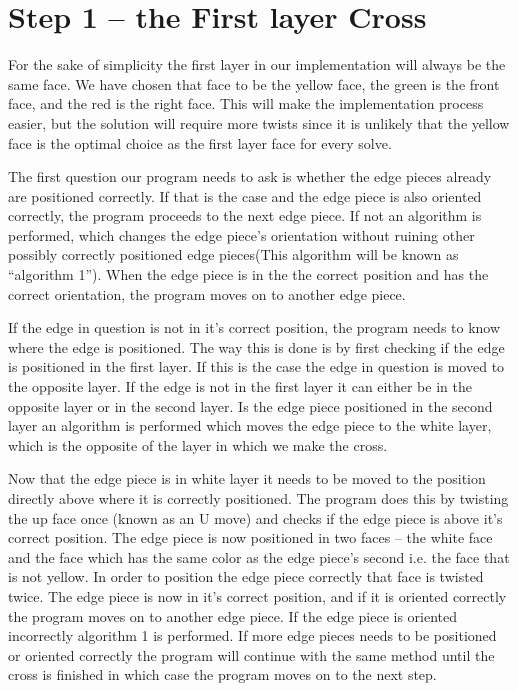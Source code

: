 \section{Step 1 -- the First layer Cross}
For the sake of simplicity the first layer in our implementation will always be the same face. We have chosen that face to be the yellow face, the green is the front face, and the red is the right face. This will make the implementation process easier, but the solution will require more twists since it is unlikely that the yellow face is the optimal choice as the first layer face for every solve.

The first question our program needs to ask is whether the edge pieces already are positioned correctly. If that is the case and the edge piece is also oriented correctly, the program proceeds to the next edge piece. If not an algorithm is performed, which changes the edge piece's orientation without ruining other possibly correctly positioned edge pieces(This algorithm will be known as "`algorithm 1"'). When the edge piece is in the the correct position and has the correct orientation, the program moves on to another edge piece. 

If the edge \cpiece{} in question is not in it's correct position, the program needs to know where the edge is positioned. 
The way this is done is by first checking if the edge \cpiece{} is positioned in the first layer. 
If this is the case the edge \cpiece{} in question is moved to the opposite layer. 
If the edge \cpiece{} is not in the first layer it can either be in the opposite layer or in the second layer.
Is the edge piece positioned in the second layer an algorithm is performed which moves the edge piece to the white layer, which is the opposite of the layer in which we make the cross.

Now that the edge piece is in white layer it needs to be moved to the position directly above where it is correctly positioned. 
The program does this by twisting the up face once (known as an U move) and checks if the edge piece is above it's correct position.
The edge piece is now positioned in two faces -- the white face and the face which has the same color as the edge piece's second \facelet{} i.e. the face that is not yellow.
In order to position the edge piece correctly that face is twisted twice.
The edge piece is now in it's correct position, and if it is oriented correctly the program moves on to another edge piece.
If the edge piece is oriented incorrectly algorithm 1 is performed. If more edge pieces needs to be positioned or oriented correctly the program will continue with the same method until the cross is finished in which case the program moves on to the next step.

